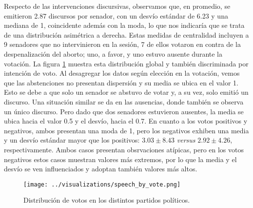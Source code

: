 Respecto de las intervenciones discursivas, observamos que, en promedio, se emitieron
2.87 discursos por senador, con un desvío estándar de 6.23 y una mediana de 1, coincidente además
con la moda, lo que nos indicaría que se trata de una distribución asimétrica a derecha.
Estas medidas de centralidad incluyen a 9 senadores que no intervinieron en
la sesión, 7 de ellos votaron en contra de la despenalización del aborto; uno, a favor,
y uno estuvo ausente durante la votación. La figura \ref{fig-distrib-speech} muestra esta
distribución global y también discriminada por intención de voto.
Al desagregar los datos según elección en la votación, vemos que las abstenciones no presentan
dispersión y su media se ubica en el valor 1. Esto se debe a que solo un senador
se abstuvo de votar y, a su vez, solo emitió un discurso.
Una situación similar se da en las ausencias, donde también se observa un único discurso.
Pero dado que dos senadores estuvieron ausentes, la media se ubica hacia el valor 0.5 y
el desvío, hacia el 0.7.
En cuanto a los votos positivos y negativos, ambos presentan una moda de 1, pero los negativos
exhiben una media y un desvío estándar mayor que los positivos: $3.03\pm8.43$ \textit{versus} 
$2.92\pm4.26$, respectivamente. Ambos casos presentan obsrvaciones atípicas, pero en los votos
negativos estos casos muestran valores más extremos, por lo que la media y el desvío se
ven influenciados y adoptan también valores más altos.

\begin{figure}[h!]
    \centering
    \texttt{[image: ../visualizations/speech\_by\_vote.png]}
    \caption{Distribución de votos en los distintos partidos políticos.}%
    \label{fig-distrib-speech}
\end{figure}


